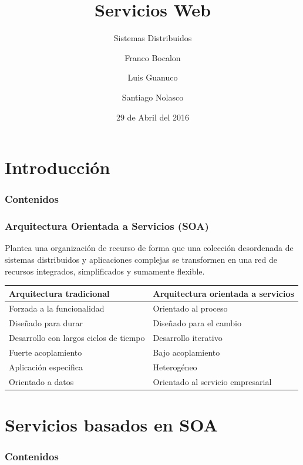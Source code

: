 \documentclass{beamer}
\title{Servicios Web}
\author{Franco Bocalon \and Luis Guanuco \and Santiago Nolasco}
\institute[ESE -- IUA]{Especialización en Sistemas Embebidos \\
  Instituto Universitario Aeronáutico}
\date{29 de Abril del 2016}
\subtitle{Sistemas Distribuidos}
\begin{document}

\begin{frame}
  \titlepage
\end{frame}

\section{Introducción}

\begin{frame}
  \frametitle{Contenidos}
\end{frame}

\begin{frame}{\insertsection{}}
  \frametitle{Arquitectura Orientada a Servicios (SOA)}
  Plantea una organización de recurso de forma que una colección
  desordenada de sistemas distribuidos y aplicaciones complejas se
  transformen en una red de recursos integrados, simplificados y
  sumamente flexible.
  \vfill
  \centering
  \footnotesize
  \begin{tabular}{|l|l|}
    \hline
    \textbf{Arquitectura tradicional} & \textbf{Arquitectura orientada
      a servicios}\\
    \hline\hline
    Forzada a la funcionalidad & Orientado al proceso \\\hline
    Diseñado para durar & Diseñado para el cambio\\\hline
    Desarrollo con largos ciclos de tiempo & Desarrollo
    iterativo\\\hline
    Fuerte acoplamiento & Bajo acoplamiento \\\hline
    Aplicación especifica & Heterogéneo\\\hline
    Orientado a datos & Orientado al servicio empresarial\\
    \hline
  \end{tabular}
\end{frame}

\section{Servicios basados en SOA}

\begin{frame}
  \frametitle{Contenidos}
\end{frame}
\end{document}
